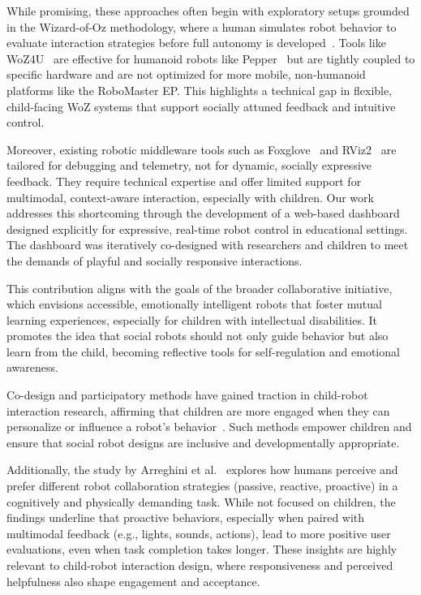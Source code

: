 \documentclass[a4paper]{usiinfbachelorproject}
\begin{document}
While promising, these approaches often begin with exploratory setups grounded in the Wizard-of-Oz methodology, where a human simulates robot behavior to evaluate interaction strategies before full autonomy is developed~\cite{weiss2010userWOZ, rietz2021woz4uPepper, SCHOONDERWOERD2022102831}.
Tools like WoZ4U~\cite{rietz2021woz4uPepper} are effective for humanoid robots like Pepper~\cite{pepper_robot} but are tightly coupled to specific hardware and are not optimized for more mobile, non-humanoid platforms like the RoboMaster EP.
This highlights a technical gap in flexible, child-facing WoZ systems that support socially attuned feedback and intuitive control.

Moreover, existing robotic middleware tools such as Foxglove~\cite{foxglove} and RViz2~\cite{rviz2} are tailored for debugging and telemetry, not for dynamic, socially expressive feedback.
They require technical expertise and offer limited support for multimodal, context-aware interaction, especially with children.
Our work addresses this shortcoming through the development of a web-based dashboard designed explicitly for expressive, real-time robot control in educational settings.
The dashboard was iteratively co-designed with researchers and children to meet the demands of playful and socially responsive interactions.

This contribution aligns with the goals of the broader collaborative initiative, which envisions accessible, emotionally intelligent robots that foster mutual learning experiences, especially for children with intellectual disabilities.
It promotes the idea that social robots should not only guide behavior but also learn from the child, becoming reflective tools for self-regulation and emotional awareness.

Co-design and participatory methods have gained traction in child-robot interaction research, affirming that children are more engaged when they can personalize or influence a robot's behavior~\cite{osti_10386132, rose2019participatory}.
Such methods empower children and ensure that social robot designs are inclusive and developmentally appropriate.

Additionally, the study by Arreghini et al.~\cite{arreghini2022exploring} explores how humans perceive and prefer different robot collaboration strategies (passive, reactive, proactive) in a cognitively and physically demanding task.
While not focused on children, the findings underline that proactive behaviors, especially when paired with multimodal feedback (e.g., lights, sounds, actions), lead to more positive user evaluations, even when task completion takes longer.
These insights are highly relevant to child-robot interaction design, where responsiveness and perceived helpfulness also shape engagement and acceptance.
\end{document}
